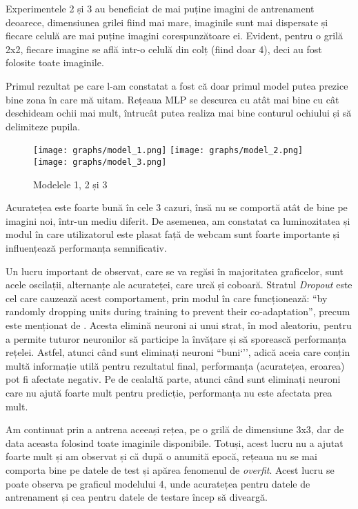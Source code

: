 Experimentele 2 și 3 au beneficiat de mai puține imagini de antrenament deoarece, dimensiunea grilei fiind mai mare, imaginile sunt mai dispersate și fiecare celulă are mai puține imagini corespunzătoare ei.
Evident, pentru o grilă 2x2, fiecare imagine se află intr-o celulă din colț (fiind doar 4), deci au fost folosite toate imaginile.

Primul rezultat pe care l-am constatat a fost că doar primul model putea prezice bine zona în care mă uitam.
Rețeaua MLP se descurca cu atât mai bine cu cât deschideam ochii mai mult, întrucât putea realiza mai bine conturul ochiului și să delimiteze pupila.

\begin{figure}[H]
    \centering
    \texttt{[image: graphs/model\_1.png]}
    \texttt{[image: graphs/model\_2.png]}
    \texttt{[image: graphs/model\_3.png]}
    \caption{Modelele 1, 2 și 3}
\end{figure}

Acuratețea este foarte bună în cele 3 cazuri, însă nu se comportă atât de bine pe imagini noi, într-un mediu diferit.
De asemenea, am constatat ca luminozitatea și modul în care utilizatorul este plasat față de webcam sunt foarte importante și influențează performanța semnificativ.

Un lucru important de observat, care se va regăsi în majoritatea graficelor, sunt acele oscilații, alternanțe ale acurateței, care urcă și coboară.
Stratul \emph{Dropout} este cel care cauzează acest comportament, prin modul în care funcționează: ``by randomly dropping units during training to prevent their co-adaptation'', precum este menționat de \cite{dropout_algorithm}.
Acesta elimină neuroni ai unui strat, în mod aleatoriu, pentru a permite tuturor neuronilor să participe la învățare și să sporească performanța rețelei.
Astfel, atunci când sunt eliminați neuroni ``buni`'', adică aceia care conțin multă informație utilă pentru rezultatul final, performanța (acuratețea, eroarea) pot fi afectate negativ.
Pe de cealaltă parte, atunci când sunt eliminați neuroni care nu ajută foarte mult pentru predicție, performanța nu este afectata prea mult.

Am continuat prin a antrena aceeași rețea, pe o grilă de dimensiune 3x3, dar de data aceasta folosind toate imaginile disponibile.
Totuși, acest lucru nu a ajutat foarte mult și am observat și că după o anumită epocă, rețeaua nu se mai comporta bine pe datele de test și apărea fenomenul de \emph{overfit}.
Acest lucru se poate observa pe graficul modelului 4, unde acuratețea pentru datele de antrenament și cea pentru datele de testare încep să diveargă.

